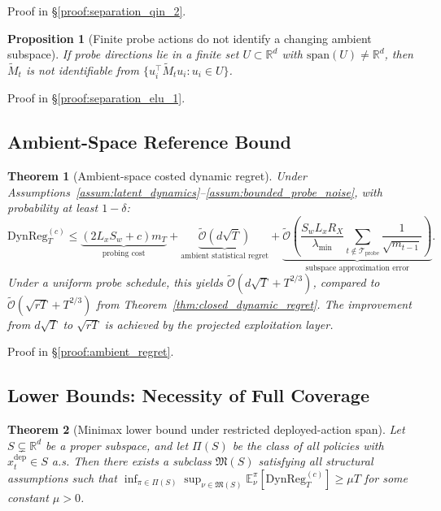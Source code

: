 \documentclass{article}
\newcommand{\R}{\mathbb{R}}
\newcommand{\E}{\mathbb{E}}
\newcommand{\cTprobe}{\mathcal{T}_{\mathrm{probe}}}
\newcommand{\tilO}{\widetilde{\mathcal{O}}}
\newcommand{\DynReg}{\mathrm{DynReg}}
\newcommand{\Span}{\mathrm{span}}
\newtheorem{theorem}{Theorem}
\newtheorem{proposition}{Proposition}
\begin{document}
Proof in \S\ref{proof:separation_qin_2}.

\begin{proposition}[Finite probe actions do not identify a changing ambient subspace]
\label{prop:separation_elu_1}
If probe directions lie in a finite set $U \subset \R^d$ with $\Span(U) \neq \R^d$, then $\widetilde M_t$ is not identifiable from $\{u_i^\top \widetilde M_t u_i : u_i \in U\}$.
\end{proposition}

Proof in \S\ref{proof:separation_elu_1}.

\subsection{Ambient-Space Reference Bound}
\label{app:ambient_reference}

\begin{theorem}[Ambient-space costed dynamic regret]
\label{thm:ambient_regret}
Under Assumptions~\ref{assum:latent_dynamics}--\ref{assum:bounded_probe_noise}, with probability at least $1-\delta$:
\[
    \DynReg_T^{(c)} \le \underbrace{(2 L_x S_w + c) m_T}_{\text{probing cost}}
    + \underbrace{\tilO(d \sqrt{T})}_{\text{ambient statistical regret}}
    + \underbrace{\tilO\!\left( \frac{S_w L_x R_X}{\lambda_{\min}} \sum_{t \notin \cTprobe} \frac{1}{\sqrt{m_{t-1}}} \right)}_{\text{subspace approximation error}}.
\]
Under a uniform probe schedule, this yields $\tilO(d\sqrt{T} + T^{2/3})$, compared to $\tilO(\sqrt{rT} + T^{2/3})$ from Theorem~\ref{thm:closed_dynamic_regret}.
The improvement from $d\sqrt{T}$ to $\sqrt{rT}$ is achieved by the projected exploitation layer.
\end{theorem}

Proof in \S\ref{proof:ambient_regret}.

\subsection{Lower Bounds: Necessity of Full Coverage}
\label{app:coverage_lower_bound}
\label{app:coverage_lower_bound_statements}

\begin{theorem}[Minimax lower bound under restricted deployed-action span]
\label{thm:restricted_span_minimax_regret}
Let $S \subsetneq \R^d$ be a proper subspace, and let $\Pi(S)$ be the class of all policies with $x_t^{\mathrm{dep}} \in S$ a.s.
Then there exists a subclass $\mathfrak M(S)$ satisfying all structural assumptions such that
$\inf_{\pi \in \Pi(S)} \sup_{\nu \in \mathfrak M(S)} \E_\nu^\pi[\DynReg_T^{(c)}] \ge \mu T$
for some constant $\mu > 0$.
\end{theorem}
\end{document}

